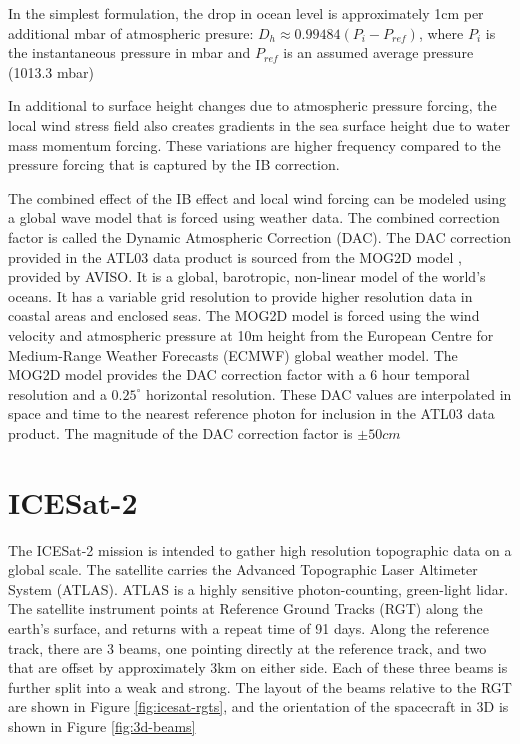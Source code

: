 In the simplest formulation, the drop in ocean level is approximately 1cm per additional mbar of atmospheric presure: $D_h \approx 0.99484(P_i-P_{ref})$, where $P_i$ is the instantaneous pressure in mbar and $P_{ref}$ is an assumed average pressure (1013.3 mbar) \parencite{Neumann2019e}

In additional to surface height changes due to atmospheric pressure forcing, the local wind stress field also creates gradients in the sea surface height due to water mass momentum forcing. These variations are higher frequency compared to the pressure forcing that is captured by the IB correction.

The combined effect of the IB effect and local wind forcing can be modeled using a global wave model that is forced using weather data. The combined correction factor is called the Dynamic Atmospheric Correction (DAC). The DAC correction provided in the ATL03 data product is sourced from the MOG2D model \parencite{LeProvost1994}, provided by AVISO. It is a global, barotropic, non-linear model of the world's oceans. It has a variable grid resolution to provide higher resolution data in coastal areas and enclosed seas. The MOG2D model is forced using the wind velocity and atmospheric pressure at 10m height from the European Centre for Medium-Range Weather Forecasts (ECMWF) global weather model. The MOG2D model provides the DAC correction factor with a 6 hour temporal resolution and a $0.25^{\circ}$ horizontal resolution. These DAC values are interpolated in space and time to the nearest reference photon for inclusion in the ATL03 data product. The magnitude of the DAC correction factor is $\pm 50 cm$


\section{ICESat-2}

The ICESat-2 mission is intended to gather high resolution topographic data on a global scale. The satellite carries the Advanced Topographic Laser Altimeter System (ATLAS). ATLAS is a highly sensitive photon-counting, green-light lidar. The satellite instrument points at Reference Ground Tracks (RGT) along the earth's surface, and returns with a repeat time of 91 days. Along the reference track, there are 3 beams, one pointing directly at the reference track, and two that are offset by approximately 3km on either side. Each of these three beams is further split into a weak and strong. The layout of the beams relative to the RGT are shown in Figure \ref{fig:icesat-rgts}, and the orientation of the spacecraft in 3D is shown in Figure \ref{fig:3d-beams}

